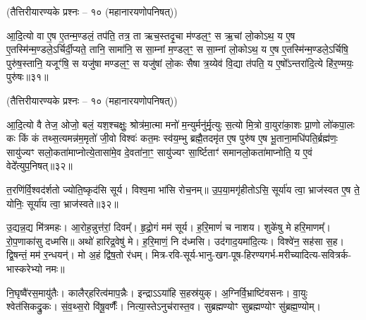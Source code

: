 \begin{minipage}{\linewidth}
    \centerline{\scriptsize (तैत्तिरीयारण्यके प्रश्नः – १० (महानारयणोपनिषत्))}
    आ॒दि॒त्यो वा ए॒ष ए॒तन्म॒ण्डलं॒ तप॑ति॒ तत्र॒ ता ऋच॒स्तदृ॒चा म॑ण्डल॒ꣳ॒ स ऋ॒चां लो॒कोऽथ॒ य ए॒ष ए॒तस्मि॑न्म॒ण्डले॒ऽर्चिर्दी॒प्यते॒ तानि॒ सामा॑नि॒ स सा॒म्नां म॒ण्डल॒ꣳ॒ स सा॒म्नां लो॒कोऽथ॒ य ए॒ष ए॒तस्मि॑न्म॒ण्डले॒ऽर्चिषि॒ पुरु॑ष॒स्तानि॒ यजूꣳ॑षि॒ स यजु॑षा मण्डल॒ꣳ॒ स यजु॑षां लो॒कः सैषा त्र॒य्येव॑ वि॒द्या त॑पति॒ य ए॒षो᳚ऽन्तरा॑दि॒त्ये हि॑र॒ण्मयः॒ पुरु॑षः॥३१॥
    \end{minipage}
    
    
    \begin{minipage}{\linewidth}
    \centerline{\scriptsize (तैत्तिरीयारण्यके प्रश्नः – १० (महानारयणोपनिषत्))}
    आ॒दि॒त्यो वै तेज॒ ओजो॒ बलं॒ यश॒श्चक्षुः॒ श्रोत्र॑मा॒त्मा मनो॑ म॒न्युर्मनु॑र्मृ॒त्युः स॒त्यो मि॒त्रो वा॒युरा॑का॒शः प्रा॒णो लो॑कपा॒लः कः किं कं तथ्स॒त्यमन्न॑म॒मृतो॑ जी॒वो विश्वः॑ कत॒मः स्व॑य॒म्भु ब्रह्मै॒तदमृ॑त ए॒ष पुरु॑ष ए॒ष भू॒ताना॒मधि॑पति॒र्ब्रह्म॑णः॒ सायु॑ज्यꣳ सलो॒कता॑माप्नोत्ये॒तासा॑मे॒व दे॒वता॑ना॒ꣳ॒ सायु॑ज्यꣳ सा॒र्ष्टिताꣳ॑ समानलो॒कता॑माप्नोति॒ य ए॒वं वेदे᳚त्युप॒निषत्॥३२॥
\end{minipage}

\closesub

\begin{minipage}{\linewidth}
त॒रणि॑र्वि॒श्वद॑र्\mbox{}शतो ज्योति॒ष्कृद॑सि सूर्य। विश्व॒मा भा॑सि रोच॒नम्॥ उ॒प॒या॒मगृ॑हीतो\-ऽसि॒ सूर्या॑य त्वा॒ भ्राज॑स्वत ए॒ष ते॒ योनिः॒ सूर्या॑य त्वा॒ भ्राज॑स्वते॥३२॥
\end{minipage}

\begin{minipage}{\linewidth}

उ॒द्यन्न॒द्य मि॑त्रमहः। 
आ॒रोह॒न्नुत्त॑रां॒ दिवम्᳚।
हृ॒द्रो॒गं मम॑ सूर्य।
ह॒रि॒माणं॑ च नाशय।
शुके॑षु मे हरि॒माणम्᳚।
रो॒प॒णाका॑सु दध्मसि॥
अथो॑ हारिद्र॒वेषु॑ मे।
ह॒रि॒माणं॒ नि द॑ध्मसि।
उद॑गाद॒यमा॑दि॒त्यः।
विश्वे॑न॒ सह॑सा स॒ह।
द्वि॒षन्तं॒ मम॑ र॒न्धयन्॑।
मो अ॒हं द्वि॑ष॒तो र॑धम्।
मित्र-रवि-सूर्य-भानु-खग-पूष-हिरण्यगर्भ-मरीच्यादित्य-सवित्रर्क-भास्करेभ्यो नमः॥
\end{minipage}

\closesection
\clearpage
 
\clearpage


\begin{minipage}{\linewidth}
नि॒घृष्वै॑रस॒मायु॑तैः। कालैर्‌हरित्व॑माप॒न्नैः। 
इन्द्राऽऽया॑हि स॒हस्र॑\-युक्। अ॒ग्निर्वि॒भ्राष्टि॑वसनः। 
वा॒युः श्वेत॑सिकद्रु॒कः। सं॒व॒थ्स॒रो वि॑षू॒\-वर्णैः᳚। 
नित्या॒स्तेऽ\-नु\-च॑रास्त॒व। सुब्रह्मण्योꣳ सुब्रह्मण्योꣳ सु॑ब्रह्म॒ण्योम्।\\ 
\end{minipage}

